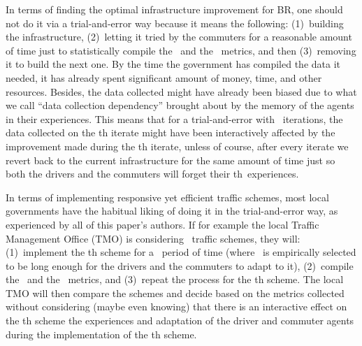\documentclass[preprint]{./acm_proc_article-sp}
\begin{document}
In terms of finding the optimal infrastructure improvement for BR, one should not do it via a trial-and-error way because it means the following: (1)~building the infrastructure, (2)~letting it tried by the commuters for a reasonable amount of time just to statistically compile the~ and the~ metrics, and then (3)~removing it to build the next one. By the time the government has compiled the data it needed, it has already spent significant amount of money, time, and other resources. Besides, the data collected might have already been biased due to what we call ``data collection dependency'' brought about by the memory of the agents in their experiences. This means that for a trial-and-error with ~iterations, the data collected on the th iterate might have been interactively affected by the improvement made during the th iterate, unless of course, after every iterate we revert back to the current infrastructure for the same amount of time just so both the drivers and the commuters will forget their th~experiences. 

In terms of implementing responsive yet efficient traffic schemes, most local governments have the habitual liking of doing it in the trial-and-error way, as experienced by all of this paper's authors. If for example the local Traffic Management Office (TMO) is considering ~traffic schemes, they will: (1)~implement the th scheme for a ~period of time (where ~is empirically selected to be long enough for the drivers and the commuters to adapt to it), (2)~compile the~ and the~ metrics, and (3)~repeat the process for the th scheme. The local TMO will then compare the schemes and decide based on the metrics collected without considering (maybe even knowing) that there is an interactive effect on the th scheme the experiences and adaptation of the driver and commuter agents during the implementation of the th scheme.
\end{document}
